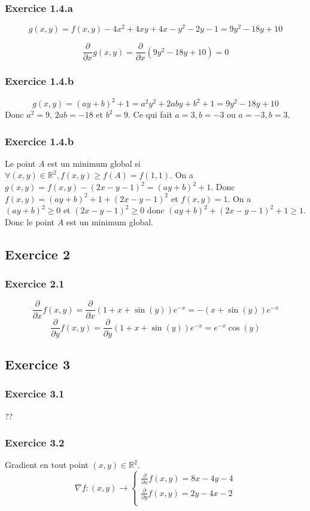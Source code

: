 \documentclass[]{book}
\theoremstyle{definition}
\newcommand{\bb}[1]{\mathbb{#1}}
\newcommand{\R}{\bb{R}}
\begin{document}
\subsubsection*{Exercice 1.4.a}
$$
g(x,y) = f(x,y) - 4x^2 + 4xy +4x -y^2 -2y -1 = 9y^2 -18y +10 
$$

$$
\frac{\partial }{\partial x}g(x,y) = \frac{\partial }{\partial x}(9y^2 -18y +10) = 0
$$

\subsubsection*{Exercice 1.4.b}
$$
g(x,y) = (ay+b)^2 + 1 = a^2y^2+2aby+b^2+1 = 9y^2-18y+10
$$
Donc $a^2=9$, $2ab = -18$  et $b^2=9$. Ce qui fait $a=3,b=-3$ ou $a=-3,b=3$.

\subsubsection*{Exercice 1.4.b}
Le point $A$ est un minimum global si $\forall (x,y) \in \R^2, f(x,y) \ge f(A) = f(1,1)$.	On a $g(x,y) = f(x,y) - (2x-y-1)^2 = (ay+b)^2+1$. Donc $f(x,y) = (ay+b)^2+1 + (2x-y-1)^2$ et $f(x,y) = 1$. On a $(ay+b)^2 \ge 0$ et $(2x-y-1)^2 \ge 0$ donc $(ay+b)^2 + (2x-y-1)^2 +1 \ge 1$. Donc le point $A$ est un minimum global.


\subsection*{Exercice 2}
\subsubsection*{Exercice 2.1}
$$
\frac{\partial }{\partial x}f(x,y) = \frac{\partial }{\partial x} (1+x+\sin(y))e^{-x} = −(x+\sin(y))e^{−x}
$$
$$
\frac{\partial }{\partial y}f(x,y) = \frac{\partial }{\partial y} (1+x+\sin(y))e^{-x} = e^{-x}\cos(y)
$$


\subsection*{Exercice 3}
\subsubsection*{Exercice 3.1}
??
\subsubsection*{Exercice 3.2}
Gradient en tout point $(x,y) \in \R^2$.
$$
\nabla f : (x,y) \to \left\{
\begin{array}{l}
\frac{\partial }{\partial x}f(x,y) = 8x - 4y -4 \\
\frac{\partial }{\partial y}f(x,y) = 2y - 4x -2 \\
\end{array}
\right.
$$
\end{document}
